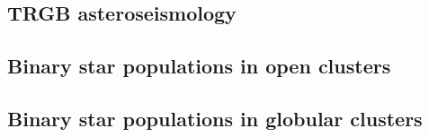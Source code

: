 \documentclass[modern]{aastex62}
\begin{document}
\subsection{TRGB asteroseismology}

\subsection{Binary star populations in open clusters}

\subsection{Binary star populations in globular clusters}





\end{document}
